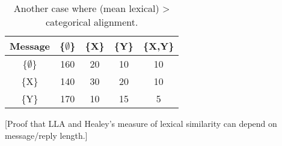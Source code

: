 \documentclass[11pt]{article}
\begin{document}
\begin{table}[h]
\begin{center}
\begin{tabular}{|c||c|c|c|c|}
\hline 
\bf Message & \{$\emptyset$\} & \{X\} & \{Y\} & \{X,Y\} \\ \hline
\{$\emptyset$\} &  160 & 20 & 10 & 10\\
\{X\} & 140 & 30 & 20 & 10 \\
\{Y\} & 170 & 10 & 15 & 5 \\
\hline
\end{tabular}
\end{center}
\caption{\label{table:cnw-example2} Another case where (mean lexical) > categorical alignment.}
\end{table}

[Proof that LLA and Healey's measure of lexical similarity can depend on message/reply length.]
\end{document}
